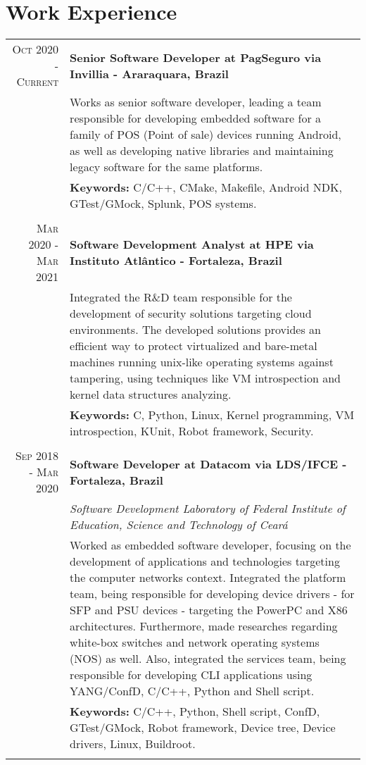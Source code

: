 \documentclass[a4paper,10pt]{article}
\begin{document}
\section{Work Experience}
\begin{tabular}{r|p{11cm}}

\textsc{Oct 2020 - Current} &\textbf{Senior Software Developer at PagSeguro via Invillia - Araraquara, Brazil} \\&\footnotesize{Works as senior software developer, leading a team responsible for developing embedded software for a family of POS (Point of sale) devices running Android, as well as developing native libraries and maintaining legacy software for the same platforms.}
\\ & \footnotesize{\textbf{Keywords:} C/C++, CMake, Makefile, Android NDK, GTest/GMock, Splunk, POS systems.}
\\\multicolumn{2}{c}{} \\

\textsc{Mar 2020 - Mar 2021} &\textbf{Software Development Analyst at HPE via Instituto Atlântico - Fortaleza, Brazil} \\&\footnotesize{Integrated the R\&D team responsible for the development of security solutions targeting cloud environments. The developed solutions provides an efficient way to protect virtualized and bare-metal machines running unix-like operating systems against tampering, using techniques like VM introspection and kernel data structures analyzing.}
\\ & \footnotesize{\textbf{Keywords:} C, Python, Linux, Kernel programming, VM introspection, KUnit, Robot framework, Security.}
\\\multicolumn{2}{c}{} \\

\textsc{Sep 2018 - Mar 2020} &\textbf{Software Developer at Datacom via LDS/IFCE - Fortaleza, Brazil} \\&\emph{Software Development Laboratory of Federal Institute of Education, Science
and Technology of Ceará}\\&\footnotesize{Worked as embedded software developer, focusing on the development of applications and technologies targeting the computer networks context. Integrated the platform team, being responsible for developing device drivers - for SFP and PSU devices - targeting the PowerPC and X86 architectures. Furthermore,  made researches regarding white-box switches and network operating systems (NOS) as well.
Also, integrated the services team, being responsible for developing CLI applications using YANG/ConfD, C/C++, Python and Shell script.}
\\ & \footnotesize{\textbf{Keywords:} C/C++, Python, Shell script, ConfD,  GTest/GMock, Robot framework, Device tree, Device drivers, Linux, Buildroot.}
\\\multicolumn{2}{c}{} \\


\end{tabular}
\end{document}
